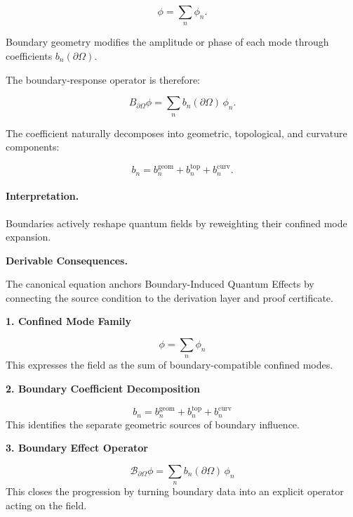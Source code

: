 \begin{equation}
\phi=\sum_n \phi_n .
\end{equation}

Boundary geometry modifies the amplitude or phase of each mode through coefficients $b_n(\partial\Omega)$.

The boundary-response operator is therefore:

\begin{equation}
\boxed{
B_{\partial\Omega}\phi
=
\sum_n b_n(\partial\Omega)\,\phi_n .
}
\end{equation}

The coefficient naturally decomposes into geometric, topological, and curvature components:

\begin{equation}
b_n
=
b_n^{\mathrm{geom}}
+
b_n^{\mathrm{top}}
+
b_n^{\mathrm{curv}} .
\end{equation}

\paragraph{Interpretation.}
Boundaries actively reshape quantum fields by reweighting their confined mode expansion.

\par\vspace{0.35em}
\noindent\textbf{Derivable Consequences.}\quad
\begingroup
\footnotesize
\raggedright
The canonical equation anchors Boundary-Induced Quantum Effects by connecting the source condition to the derivation layer and proof certificate.
\par\endgroup

\noindent\textbf{1. Confined Mode Family}\par
\[
\phi = \sum_{n}\phi_{n}
\]
\noindent This expresses the field as the sum of boundary-compatible confined modes.\par
\noindent\textbf{2. Boundary Coefficient Decomposition}\par
\[
b_{n} = b_{n}^{\mathrm{geom}} + b_{n}^{\mathrm{top}} + b_{n}^{\mathrm{curv}}
\]
\noindent This identifies the separate geometric sources of boundary influence.\par
\noindent\textbf{3. Boundary Effect Operator}\par
\[
\mathcal{B}_{\partial\Omega}\phi
=
\sum_{n} b_{n}(\partial\Omega)\,\phi_{n}
\]
\noindent This closes the progression by turning boundary data into an explicit operator acting on the field.\par

